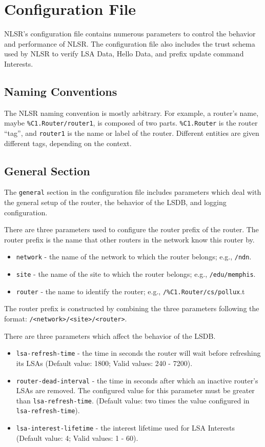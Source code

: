 \section{Configuration File}
\label{sec:configuration}

NLSR's configuration file contains numerous parameters to control the behavior and performance of NLSR.
The configuration file also includes the trust schema used by NLSR to verify LSA Data, Hello Data, and prefix update command Interests.

\subsection{Naming Conventions}
The NLSR naming convention is mostly arbitrary. For example, a router's name, maybe \texttt{\%C1.Router/router1}, is composed of two parts. \texttt{\%C1.Router} is the router ``tag'', and \texttt{router1} is the name or label of the router. Different entities are given different tags, depending on the context.

\subsection{General Section}

The \texttt{general} section in the configuration file includes parameters which deal with the general setup of the router, the behavior of the LSDB, and logging configuration.

There are three parameters used to configure the router prefix of the router.
The router prefix is the name that other routers in the network know this router by.
\begin{itemize}
\item \texttt{network} - the name of the network to which the router belongs; e.g., \texttt{/ndn}.
\item \texttt{site} - the name of the site to which the router belongs; e.g., \texttt{/edu/memphis}.
\item \texttt{router} - the name to identify the router; e.g., \texttt{/\%C1.Router/cs/pollux}.t
\end{itemize}
The router prefix is constructed by combining the three parameters following the format: \texttt{/<network>/<site>/<router>}.

There are three parameters which affect the behavior of the LSDB.
\begin{itemize}
\item \texttt{lsa-refresh-time} - the time in seconds the router will wait before refreshing its LSAs (Default value: 1800; Valid values: 240 - 7200).
\item \texttt{router-dead-interval} - the time in seconds after which an inactive router's LSAs are removed.
The configured value for this parameter must be greater than \texttt{lsa-refresh-time}. (Default value: two times the value configured in \texttt{lsa-refresh-time}).
\item \texttt{lsa-interest-lifetime} - the interest lifetime used for LSA Interests (Default value: 4; Valid values: 1 - 60).
\end{itemize}

